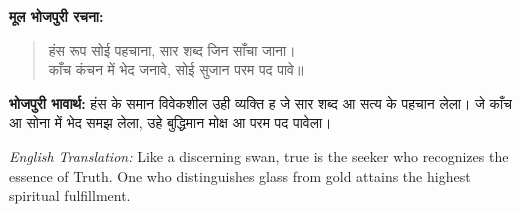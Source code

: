 \textbf{मूल भोजपुरी रचना:}

\begin{quote}
हंस रूप सोई पहचाना, सार शब्द जिन साँचा जाना।\\
काँच कंचन में भेद जनावे, सोई सुजान परम पद पावे॥
\end{quote}

\textbf{भोजपुरी भावार्थ:} हंस के समान विवेकशील उही व्यक्ति ह जे सार शब्द आ सत्य के पहचान लेला। जे काँच आ सोना में भेद समझ लेला, उहे बुद्धिमान मोक्ष आ परम पद पावेला।

\begin{sloppypar}
{\engfont \textit{English Translation:} Like a discerning swan, true is the seeker who recognizes the essence of Truth.
One who distinguishes glass from gold attains the highest spiritual fulfillment.}
\end{sloppypar}
